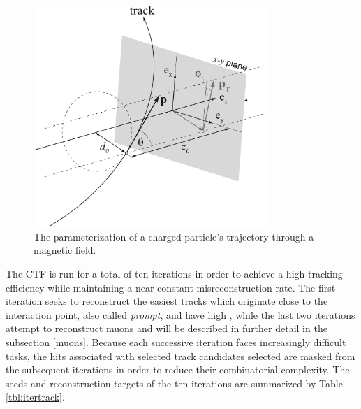 \begin{figure}[htbp]
  \centering
    \includegraphics[width=3.5in]{images/track_parameters}
    \caption[Charged Particle Trajectory Parameterization]{The parameterization of a charged particle's trajectory through a magnetic field.\cite{salzburger}}
    \label{fig:track_params}
\end{figure}

The CTF is run for a total of ten iterations in order to achieve a high tracking efficiency while maintaining a near constant misreconstruction rate. The first iteration seeks to reconstruct the easiest tracks which originate close to the interaction point, also called \textit{prompt}, and have high \pT, while the last two iterations attempt to reconstruct muons and will be described in further detail in the subsection \ref{muons}. Because each successive iteration faces increasingly difficult tasks, the hits associated with selected track candidates selected are masked from the subsequent iterations in order to reduce their combinatorial complexity. The seeds and reconstruction targets of the ten iterations are summarized by Table \ref{tbl:itertrack}.

